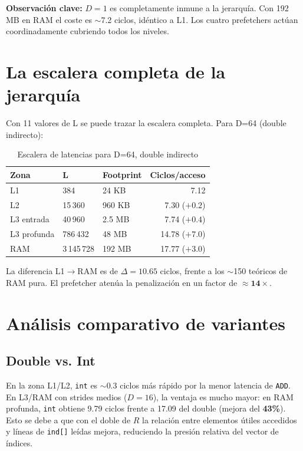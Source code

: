\documentclass[12pt,a4paper]{article}
\begin{document}
\textbf{Observación clave:} $D=1$ es completamente inmune a la jerarquía.
Con 192 MB en RAM el coste es $\sim$7.2 ciclos, idéntico a L1. Los cuatro prefetchers actúan coordinadamente cubriendo todos los niveles.

\section{La escalera completa de la jerarquía}

Con 11 valores de L se puede trazar la escalera completa.
Para D=64 (double indirecto):

\begin{table}[H]
\centering
\caption{Escalera de latencias para D=64, double indirecto}
\label{tab:escalera}
\begin{tabular}{lllr}
\toprule
\textbf{Zona} & \textbf{L} & \textbf{Footprint} & \textbf{Ciclos/acceso} \\
\midrule
L1            & 384         & 24 KB    & 7.12 \\
L2            & 15\,360     & 960 KB   & 7.30 ($+0.2$) \\
L3 entrada    & 40\,960     & 2.5 MB   & 7.74 ($+0.4$) \\
L3 profunda   & 786\,432    & 48 MB    & 14.78 ($+7.0$) \\
RAM           & 3\,145\,728 & 192 MB   & 17.77 ($+3.0$) \\
\bottomrule
\end{tabular}
\end{table}

La diferencia L1$\to$RAM es de $\Delta = 10.65$ ciclos, frente a los $\sim$150 teóricos de RAM pura.
El prefetcher atenúa la penalización en un factor de $\approx \mathbf{14\times}$.

\section{Análisis comparativo de variantes}

\subsection{Double vs. Int}

En la zona L1/L2, \texttt{int} es $\sim$0.3 ciclos más rápido por la menor latencia de \texttt{ADD}.
En L3/RAM con strides medios ($D=16$), la ventaja es mucho mayor: en RAM profunda, \texttt{int} obtiene 9.79 ciclos frente a 17.09 del double (mejora del \textbf{43\%}). Esto se debe a que con el doble de $R$ la relación entre elementos útiles accedidos y líneas de \texttt{ind[]} leídas mejora, reduciendo la presión relativa del vector de índices.
\end{document}
